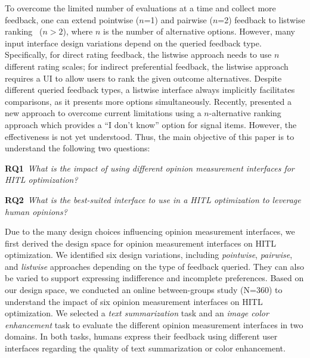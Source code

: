 \documentclass[acmsmall,screen,nonacm]{acmart}
\begin{document}
To overcome the limited number of evaluations at a time and collect more feedback, one can extend pointwise ($n$=1) and pairwise ($n$=2) feedback to listwise ranking~\cite{cao2007learning, siivola2021preferential} ($n>2$), where $n$ is the number of alternative options. However, many input interface design variations depend on the queried feedback type. Specifically, for direct rating feedback, the listwise approach needs to use $n$ different rating scales; for indirect preferential feedback, the listwise approach requires a UI to allow users to rank the given outcome alternatives. Despite different queried feedback types, a listwise interface always implicitly facilitates comparisons, as it presents more options simultaneously.
Recently, \citet{ou2023expertise} presented a new approach to overcome current limitations using a $n$-alternative ranking approach which provides a ``I don't know'' option for signal items. However, the effectiveness is not yet understood. Thus, the main objective of this paper is to understand the following two questions:\vspace{4pt}

\noindent\textbf{RQ1}~\emph{What is the impact of using different opinion measurement interfaces for HITL optimization?}

\noindent\textbf{RQ2}~\emph{What is the best-suited interface to use in a HITL optimization to leverage human opinions?}\vspace{4pt}

Due to the many design choices influencing opinion measurement interfaces, we first derived the design space for opinion measurement interfaces on HITL optimization. We identified six design variations, including \textit{pointwise}, \textit{pairwise}, and \textit{listwise} approaches depending on the type of feedback queried. They can also be varied to support expressing indifference and incomplete preferences. Based on our design space, we conducted an online between-groups study (N=360) to understand the impact of six opinion measurement interfaces on HITL optimization. We selected a \emph{text summarization} task and an \emph{image color enhancement} task to evaluate the different opinion measurement interfaces in two domains. In both tasks, humans express their feedback using different user interfaces regarding the quality of text summarization or color enhancement. 
\end{document}
